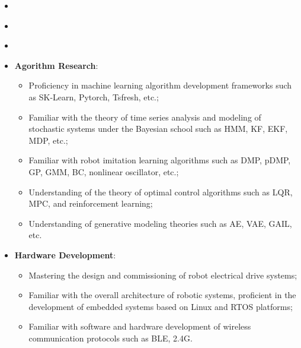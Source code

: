 \begin{itemize}[leftmargin=*]
  \item {}
\end{itemize}

\vspace{-1mm}
\begin{itemize}[leftmargin=*]
  \item {}
\end{itemize}

\vspace{-1mm}
\begin{itemize}[leftmargin=*]
  \item {}
\end{itemize}

\vspace{-1mm}
\begin{itemize}[leftmargin=*]
  \item \textbf{Agorithm Research}: 
  {\small
  \begin{itemize}
    \item Proficiency in machine learning algorithm development frameworks such as SK-Learn, Pytorch, Tsfresh, etc.;
    \item Familiar with the theory of time series analysis and modeling of stochastic systems under the Bayesian school such as HMM, KF, EKF, MDP, etc.;
    \item Familiar with robot imitation learning algorithms such as DMP, pDMP, GP, GMM, BC, nonlinear oscillator, etc.;
    \item Understanding of the theory of optimal control algorithms such as LQR, MPC, and reinforcement learning;
    \item Understanding of generative modeling theories such as AE, VAE, GAIL, etc.
  \end{itemize}}
\end{itemize}

\vspace{-3mm}
\begin{itemize}[leftmargin=*]
  \item \textbf{Hardware Development}: 
  {\small
  \begin{itemize}
    \item Mastering the design and commissioning of robot electrical drive systems;
    \item Familiar with the overall architecture of robotic systems, proficient in the development of embedded systems based on Linux and RTOS platforms;
    \item Familiar with software and hardware development of wireless communication protocols such as BLE, 2.4G.
  \end{itemize}}
\end{itemize}


